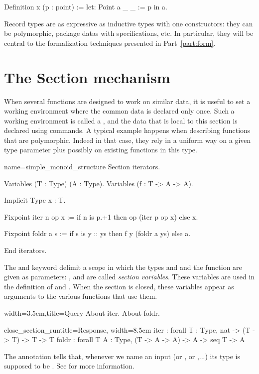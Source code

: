 \begin{coq}{}{}
Definition x (p : point) := let: Point a _ _ := p in a.
\end{coq}

Record types are as expressive as inductive types with one
constructors: they can be polymorphic, package datas with
specifications, etc. In particular, they will be central to the
formalization techniques presented in Part~\ref{part:form}.


\section{The Section mechanism}\label{sec:section}
When several functions are designed to work on similar data, it is
useful to set a working environment where the common data is declared
only once.  Such a working environment is called a , and
the data that is local to this section is declared using 
commands.  A typical example happens when describing functions that
are polymorphic. Indeed in that case, they rely in a uniform way on a
given type parameter plus possibly on existing functions in this type.


\begin{coq}{name=simple_monoid_structure}{}
Section iterators.

Variables (T : Type) (A : Type).
Variables (f : T -> A -> A).

Implicit Type x : T.

Fixpoint iter n op x :=
  if n is p.+1 then op (iter p op x) else x.

Fixpoint foldr a s :=
  if s is y :: ys then f y (foldr a ys) else a.

End iterators.
\end{coq}
The  and  keyword delimit a scope in which
the types  and  and the function  are given as
parameters: ,  and  are called \emph{section
  variables}.  These variables
are used in the definition of  and .  When
the section is closed, these variables appear as arguments to
the various functions that use them.

\begin{coq}{}{width=3.5cm,title=Query}
About iter.
About foldr.
$~$
\end{coq}
\begin{coqout}{close_section_run}{title=Response, width=8.5cm}
iter : forall T : Type, nat -> (T -> T) -> T -> T
foldr :
  forall T A : Type, (T -> A -> A) -> A -> seq T -> A
\end{coqout}
The  annotation tells \Coq{} that, whenever we name
an input  (or , or ,...) its type is supposed to be
. See \cite{Coq:manual} for more information.

